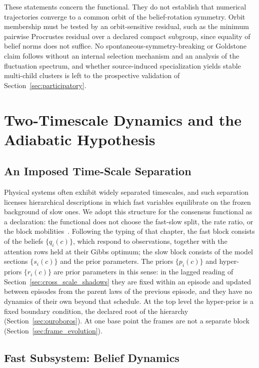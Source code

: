 These statements concern the functional. They do not establish that numerical trajectories converge to a common orbit of the belief-rotation symmetry. Orbit membership must be tested by an orbit-sensitive residual, such as the minimum pairwise Procrustes residual over a declared compact subgroup, since equality of belief norms does not suffice. No spontaneous-symmetry-breaking or Goldstone claim follows without an internal selection mechanism and an analysis of the fluctuation spectrum, and whether source-induced specialization yields stable multi-child clusters is left to the prospective validation of Section~\ref{sec:participatory}.

\section{Two-Timescale Dynamics and the Adiabatic Hypothesis}\label{sec:timescales}

\subsection{An Imposed Time-Scale Separation}

Physical systems often exhibit widely separated timescales, and such separation licenses hierarchical descriptions in which fast variables equilibrate on the frozen background of slow ones. We adopt this structure for the consensus functional as a declaration: the functional does not choose the fast-slow split, the rate ratio, or the block mobilities~\cite[Ch.~8]{DennisGaugeVFE2026}. Following the typing of that chapter, the fast block consists of the beliefs $\{q_i(c)\}$, which respond to observations, together with the attention rows held at their Gibbs optimum; the slow block consists of the model sections $\{s_i(c)\}$ and the prior parameters. The priors $\{p_i(c)\}$ and hyper-priors $\{r_i(c)\}$ are prior parameters in this sense: in the lagged reading of Section~\ref{sec:cross_scale_shadows} they are fixed within an episode and updated between episodes from the parent laws of the previous episode, and they have no dynamics of their own beyond that schedule. At the top level the hyper-prior is a fixed boundary condition, the declared root of the hierarchy (Section~\ref{sec:ouroboros}). At one base point the frames are not a separate block (Section~\ref{sec:frame_evolution}).

\subsection{Fast Subsystem: Belief Dynamics}

